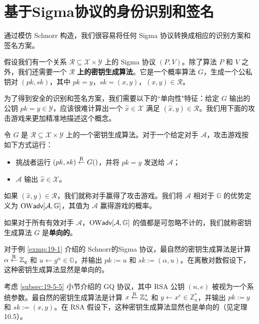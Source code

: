 \section{基于Sigma协议的身份识别和签名}\label{sec:19-6}

通过模仿 Schnorr 构造，我们很容易将任何 Sigma 协议转换成相应的识别方案和签名方案。

假设我们有一个关系 $\mathcal{R}\subseteq\mathcal{X}×\mathcal{Y}$ 上的 Sigma 协议 $(P,V)$。除了算法 $P$ 和 $V$ 之外，我们还需要一个 $\mathcal{R}$ \textbf{上的密钥生成算法}。它是一个概率算法 $G$，生成一个公私钥对 $(pk,sk)$，其中 $pk=y$，$sk=(x,y)$，$(x,y)\in\mathcal{R}$。

为了得到安全的识别和签名方案，我们需要以下的``单向性"特征：给定 $G$ 输出的公钥 $pk=y\in\mathcal{Y}$，应该很难计算出一个 $\hat x\in\mathcal{X}$ 满足 $(\hat x,y)\in\mathcal{R}$。我们用下面的攻击游戏来更加精准地描述这个概念。

\begin{game}[单向密钥生成]\label{game:19-2}
令 $G$ 是 $\mathcal{R}\subseteq\mathcal{X}×\mathcal{Y}$ 上的一个密钥生成算法。对于一个给定对手 $\mathcal{A}$，攻击游戏按如下方式运行：
\begin{itemize}
	\item 挑战者运行 $(pk,sk)\overset{\rm R}\leftarrow G()$，并将 $pk=y$ 发送给 $\mathcal{A}$；
	\item $\mathcal{A}$ 输出 $\hat x\in\mathcal{X}$。
\end{itemize}
如果 $(\hat x,y)\in\mathcal{R}$，我们就称对手赢得了攻击游戏。我们将 $\mathcal{A}$ 相对于 $\mathbb{G}$ 的优势定义为 ${\rm OW\mathsf{adv}}[\mathcal{A},\mathbb{G}]$，其值为 $\mathcal{A}$ 赢得游戏的概率。
\end{game}

\begin{definition}
如果对于所有有效对手 $\mathcal{A}$，${\rm OW\mathsf{adv}}[\mathcal{A},\mathbb{G}]$ 的值都是可忽略不计的，我们就称密钥生成算法 $G$ 是\textbf{单向的}。
\end{definition}

\begin{example}\label{exmp:19-4}
对于例 \ref{exmp:19-1} 介绍的 Schnorr的Sigma 协议，最自然的密钥生成算法是计算 $\alpha\overset{\rm R}\leftarrow\mathbb{Z}_q$ 和 $u\leftarrow g^\alpha\in\mathbb{G}$，并输出 $pk:=u$ 和 $sk:=(\alpha,u)$。在离散对数假设下，这种密钥生成算法显然是单向的。
\end{example}

\begin{example}\label{exmp:19-5}
考虑 \ref{subsec:19-5-5} 小节介绍的 GQ 协议，其中 RSA 公钥 $(n, e)$ 被视为一个系统参数。最自然的密钥生成算法是计算 $x\overset{\rm R}\leftarrow\mathbb{Z}_n^*$ 和 $y\leftarrow x^e\in\mathbb{Z}_n^*$，并输出 $pk:=y$ 和 $sk:=(x,y)$。在 RSA 假设下，这种密钥生成算法显然也是单向的（见定理10.5）。
\end{example}


